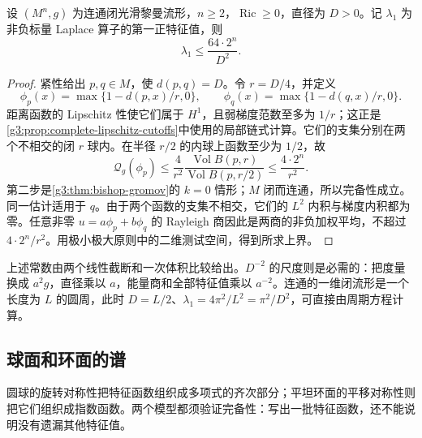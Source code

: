 \begin{proposition}\label{g3:prop:diameter-eigenvalue-upper}
	设 \((M^n,g)\) 为连通闭光滑黎曼流形，\(n\ge2\)，\(\operatorname{Ric}\ge0\)，直径为 \(D>0\)。记 \(\lambda_1\) 为非负标量 Laplace 算子的第一正特征值，则
	\[
		\lambda_1\le\frac{64\cdot2^n}{D^2}.
	\]
\end{proposition}
\begin{proof}
	紧性给出 \(p,q\in M\)，使 \(d(p,q)=D\)。令 \(r=D/4\)，并定义
	\[
		\phi_p(x)=\max\{1-d(p,x)/r,0\},\qquad
		\phi_q(x)=\max\{1-d(q,x)/r,0\}.
	\]
	距离函数的 Lipschitz 性使它们属于 \(H^1\)，且弱梯度范数至多为 \(1/r\)；这正是\cref{g3:prop:complete-lipschitz-cutoffs}中使用的局部链式计算。它们的支集分别在两个不相交的闭 \(r\) 球内。在半径 \(r/2\) 的内球上函数至少为 \(1/2\)，故
	\[
		\mathscr Q_g(\phi_p)
		\le\frac{4}{r^2}\frac{\operatorname{Vol}B(p,r)}{\operatorname{Vol}B(p,r/2)}
		\le\frac{4\cdot2^n}{r^2}.
	\]
	第二步是\cref{g3:thm:bishop-gromov}的 \(k=0\) 情形；\(M\) 闭而连通，所以完备性成立。同一估计适用于 \(q\)。由于两个函数的支集不相交，它们的 \(L^2\) 内积与梯度内积都为零。任意非零 \(u=a\phi_p+b\phi_q\) 的 Rayleigh 商因此是两商的非负加权平均，不超过 \(4\cdot2^n/r^2\)。用极小极大原则中的二维测试空间，得到所求上界。
\end{proof}

上述常数由两个线性截断和一次体积比较给出。\(D^{-2}\) 的尺度则是必需的：把度量换成 \(a^2g\)，直径乘以 \(a\)，能量商和全部特征值乘以 \(a^{-2}\)。连通的一维闭流形是一个长度为 \(L\) 的圆周，此时 \(D=L/2\)、\(\lambda_1=4\pi^2/L^2=\pi^2/D^2\)，可直接由周期方程计算。

\subsection{球面和环面的谱}
\label{g3:subsec:1604:03}
圆球的旋转对称性把特征函数组织成多项式的齐次部分；平坦环面的平移对称性则把它们组织成指数函数。两个模型都须验证完备性：写出一批特征函数，还不能说明没有遗漏其他特征值。

